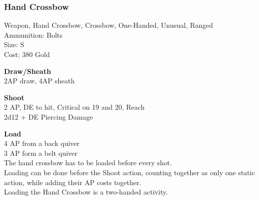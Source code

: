 \subsubsection{Hand Crossbow}\label{weapon:handCrossbow}
Weapon, Hand Crossbow, Crossbow, One-Handed, Unusual, Ranged\\
Ammunition: Bolts\\
Size: S\\
Cost: 380 Gold

\textbf{Draw/Sheath} \\
2AP draw, 4AP sheath

\textbf{Shoot} \\
2 AP, DE to hit, Critical on 19 and 20,  Reach\\
2d12 + \texttimes DE Piercing Damage

\textbf{Load} \\
4 AP from a back quiver\\
3 AP form a belt quiver\\
The hand crossbow has to be loaded before every shot.\\
Loading can be done before the Shoot action, counting together as only one static action, while adding their AP costs together.\\
Loading the Hand Crossbow is a two-handed activity.
